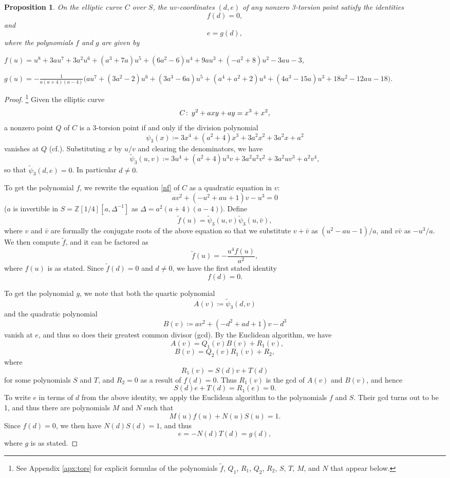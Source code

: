 \documentclass{gtpart}
\newtheorem{prop}[thm]{Proposition}
\theoremstyle{definition}
\theoremstyle{remark}
\def\co{\colon\thinspace}
\newcommand{\mb}[1]{\mathbb{#1}}
\newcommand{\cff}[2]{cf.\thinspace{\cite[#1]{#2}}}
\newcommand{\BZ}{{\mb Z}}
\newcommand{\Tf}{\widetilde{f}}
\newcommand{\TP}{\widetilde{\psi}}
\begin{document}
\begin{prop}
\label{prop:tors}
 On the elliptic curve $C$ over $S$, the $uv$-coordinates $(d,e)$ of any nonzero 3-torsion point satisfy the identities 
 \[
  f(d) = 0, 
 \]
 and 
 \[
  e = g(d), 
 \]
 where the polynomials $f$ and $g$ are given by 

 $f(u) = u^8 + 3 a u^7 + 3 a^2 u^6 + (a^3 + 7 a) u^5 + (6 a^2 - 6) u^4 + 9 a u^3 + (-a^2 + 8) u^2 - 3 a u - 3$, 

 $g(u) = -\frac{1}{a (a + 4) (a - 4)} \big(a u^7 + (3 a^2 - 2) u^6 + (3 a^3 - 6 a) u^5 + (a^4 + a^2 + 2) u^4 + (4 a^3 - 15 a) u^3 + 18 u^2 - 12 a u - 18\big)$.  
\end{prop}
\begin{proof}
 \footnote{See Appendix \ref{apx:tors} for explicit formulas of the polynomials $\Tf$, $Q_1$, $R_1$, $Q_2$, $R_2$, $S$, $T$, $M$, and $N$ that appear below.  }
 Given the elliptic curve 
 \[
  C \co y^2 + a x y + a y = x^3 + x^2, 
 \]
 a nonzero point $Q$ of $C$ is a 3-torsion point if and only if the division polynomial 
 \[
  \psi_3 (x) \coloneqq 3x^4 + (a^2 + 4) x^3 + 3a^2 x^2 + 3a^2 x + a^2 
 \]
 vanishes at $Q$ (\cff{Exercise 3.7f}{AEC}).  Substituting $x$ by $u/v$ and clearing the denominators, we have 
 \[
  \TP_3(u,v) \coloneqq 3u^4 + (a^2 + 4) u^3 v + 3a^2 u^2 v^2 + 3a^2 u v^3 + a^2 v^4, 
 \]
 so that $\TP_3(d,e) = 0$.  In particular $d \neq 0$.  

 To get the polynomial $f$, we rewrite the equation \eqref{nf} of $C$ as a quadratic equation in $v$: 
 \[
  a v^2 + (-u^2 + a u + 1) v - u^3 = 0 
 \]
 ($a$ is invertible in $S = \BZ [1/4] [a, \Delta^{-1}]$ as $\Delta = a^2 (a + 4) (a - 4)$).  
 Define 
 \[
  \Tf(u) = \TP_3(u,v) \TP_3(u,\bar{v}), 
 \]
 where $v$ and $\bar{v}$ are formally the conjugate roots of the 
 above equation so that we substitute $v + \bar{v}$ as $(u^2 - a u - 1) / a$, and $v \bar{v}$ as $-u^3 / a$.  We then compute $\Tf$, and it can be factored as 
 \[
  \Tf(u) = -\frac{u^4 f(u)}{a^2}, 
 \]
 where $f(u)$ is as stated.  
 Since $\Tf(d) = 0$ and $d \neq 0$, we have the first stated identity 
 \[
  f(d) = 0.  
 \]

 To get the polynomial $g$, we note that both the quartic polynomial 
 \[
  A(v) \coloneqq \TP_3(d,v) 
 \]
 and the quadratic polynomial 
 \[
  B(v) \coloneqq a v^2 + (-d^2 + a d + 1) v - d^3
 \]
 vanish at $e$, and thus so does their greatest common divisor (gcd).  By the Euclidean algorithm, we have 
 \[
  ~~~A(v) = Q_1(v) B(v) + R_1(v), 
 \]
 \[
  B(v) = Q_2(v) R_1(v) + R_2, 
 \]
 where 
 \[
  R_1(v) = S(d) v + T(d)
 \]
 for some polynomials $S$ and $T$, and $R_2 = 0$ as a result of $f(d) = 0$.  Thus $R_1(v)$ is the gcd of $A(v)$ and $B(v)$, and hence 
 \[
  S(d) e + T(d) = R_1(e) = 0.  
 \]
 To write $e$ in terms of $d$ from the above identity, we apply the Euclidean algorithm to the polynomials $f$ and $S$.  
 Their gcd turns out to be 1, and thus there are polynomials $M$ and $N$ such that 
 \[
  M(u) f(u) + N(u) S(u) = 1.  
 \]
 Since $f(d) = 0$, we then have $N(d) S(d) = 1$, and thus 
 \[
  e = -N(d) T(d) = g(d), 
 \]
 where $g$ is as stated.  
\end{proof}
\end{document}
